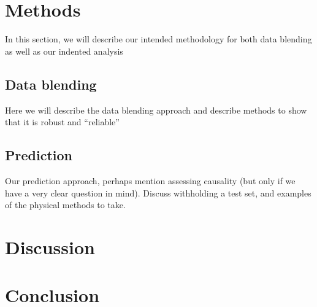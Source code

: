 \documentclass{article}
\begin{document}
\section{Methods}

In this section, we will describe our intended methodology for both data blending as well as our indented analysis

\subsection{Data blending}

Here we will describe the data blending approach and describe methods to show that it is robust and ``reliable''

\subsection{Prediction}

Our prediction approach, perhaps mention assessing causality (but only if we have a very clear question in mind). Discuss withholding a test set, and examples of the physical methods to take.


\section{Discussion}



\section{Conclusion}
\end{document}
